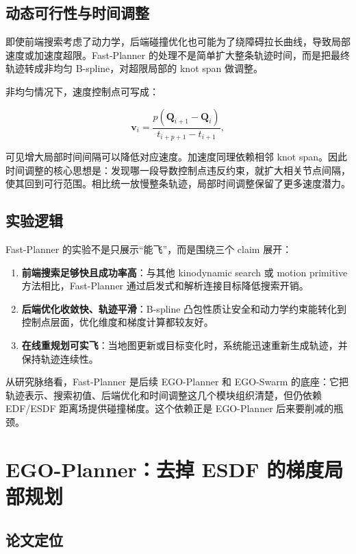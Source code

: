 \documentclass[UTF8,a4paper,12pt]{ctexart}
\newcommand{\ctrl}{\mathbf{Q}}
\newcommand{\vel}{\mathbf{v}}
\begin{document}
\subsection{动态可行性与时间调整}

即使前端搜索考虑了动力学，后端碰撞优化也可能为了绕障碍拉长曲线，导致局部速度或加速度超限。Fast-Planner 的处理不是简单扩大整条轨迹时间，而是把最终轨迹转成非均匀 B-spline，对超限局部的 knot span 做调整。

非均匀情况下，速度控制点可写成：

\begin{equation}
  \vel_i=\frac{p(\ctrl_{i+1}-\ctrl_i)}{t_{i+p+1}-t_{i+1}},
\end{equation}

可见增大局部时间间隔可以降低对应速度。加速度同理依赖相邻 knot span。因此时间调整的核心思想是：发现哪一段导数控制点违反约束，就扩大相关节点间隔，使其回到可行范围。相比统一放慢整条轨迹，局部时间调整保留了更多速度潜力。

\subsection{实验逻辑}

Fast-Planner 的实验不是只展示“能飞”，而是围绕三个 claim 展开：

\begin{enumerate}
  \item \textbf{前端搜索足够快且成功率高}：与其他 kinodynamic search 或 motion primitive 方法相比，Fast-Planner 通过启发式和解析连接目标降低搜索开销。
  \item \textbf{后端优化收敛快、轨迹平滑}：B-spline 凸包性质让安全和动力学约束能转化到控制点层面，优化维度和梯度计算都较友好。
  \item \textbf{在线重规划可实飞}：当地图更新或目标变化时，系统能迅速重新生成轨迹，并保持轨迹连续性。
\end{enumerate}

从研究脉络看，Fast-Planner 是后续 EGO-Planner 和 EGO-Swarm 的底座：它把轨迹表示、搜索初值、后端优化和时间调整这几个模块组织清楚，但仍依赖 EDF/ESDF 距离场提供碰撞梯度。这个依赖正是 EGO-Planner 后来要削减的瓶颈。

\section{EGO-Planner：去掉 ESDF 的梯度局部规划}

\subsection{论文定位}
\end{document}
